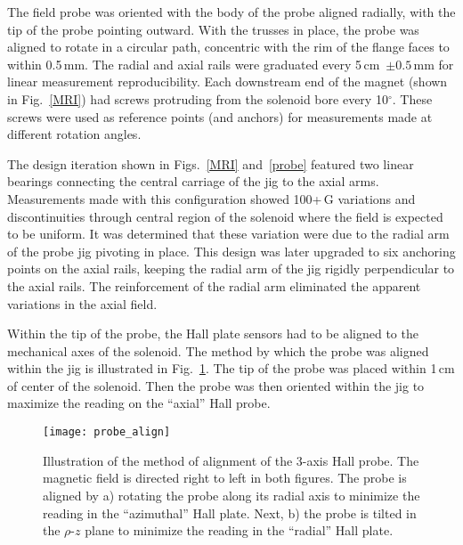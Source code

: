 The field probe was oriented with the body of the probe aligned radially, with the tip of the probe pointing outward.  With the trusses in place, the probe was aligned to rotate in a circular path, concentric with the rim of the flange faces to within 0.5\,mm.  The radial and axial rails were graduated every 5\,cm~$\pm 0.5$\,mm for linear measurement reproducibility.  Each downstream end of the magnet (shown in Fig.~\ref{MRI}) had screws protruding from the solenoid bore every 10$^\circ$.  These screws were used as reference points (and anchors) for measurements made at different rotation angles.

The design iteration shown in Figs.~\ref{MRI} and~\ref{probe} featured two linear bearings connecting the central carriage of the jig to the axial arms.  Measurements made with this configuration showed 100+\,G variations and discontinuities through central region of the solenoid where the field is expected to be uniform.  It was determined that these variation were due to the radial arm of the probe jig pivoting in place.  This design was later upgraded to six anchoring points on the axial rails, keeping the radial arm of the jig rigidly perpendicular to the axial rails.  The reinforcement of the radial arm eliminated the apparent variations in the axial field.

Within the tip of the probe, the Hall plate sensors had to be aligned to the mechanical axes of the solenoid. The method by which the probe was aligned within the jig is illustrated in Fig.~\ref{probe_align}.  The tip of the probe was placed within 1\,cm of center of the solenoid.  Then the probe was then oriented within the jig to maximize the reading on the ``axial'' Hall probe.

\begin{figure}%
\centering
\texttt{[image: probe\_align]}%
\caption[Illustration of the method of alignment of the 3-axis Hall probe]{Illustration of the method of alignment of the 3-axis Hall probe.  The magnetic field is directed right to left in both figures.  The probe is aligned by a) rotating the probe along its radial axis to minimize the reading in the ``azimuthal'' Hall plate.  Next, b) the probe is tilted in the $\rho$-$z$ plane to minimize the reading in the ``radial'' Hall plate.}%
\label{probe_align}%
\end{figure}

